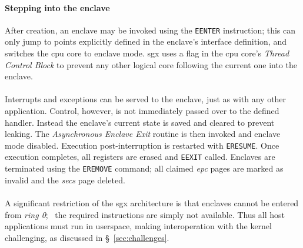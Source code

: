 \paragraph{Stepping into the enclave} After creation, an enclave may be invoked using the \texttt{EENTER} instruction; this can only jump to points explicitly defined in the enclave's interface definition, and switches the \acrshort{cpu} core to enclave mode. \acrshort{sgx} uses a flag in the \acrshort{cpu} core's \textit{Thread Control Block} to prevent any other logical core following the current one into the enclave.

\paragraph{} Interrupts and exceptions can be served to the enclave, just as with any other application. Control, however, is not immediately passed over to the defined handler. Instead the enclave's current state is saved and cleared to prevent leaking. The \textit{Asynchronous Enclave Exit} routine is then invoked and enclave mode disabled. Execution post-interruption is restarted with \texttt{ERESUME}. Once execution completes, all registers are erased and \texttt{EEXIT} called. Enclaves are terminated using the \texttt{EREMOVE} command; all claimed \textit{\acrshort{epc}} pages are marked as invalid and the \textit{\acrshort{secs}} page deleted.

\paragraph{} \label{sec:sgx-no-kernel-mode} A significant restriction of the \acrshort{sgx} architecture is that enclaves cannot be entered from \textit{ring 0};~\cite{sgx-prog-reference} the required instructions are simply not available. Thus all host applications must run in userspace, making interoperation with the kernel challenging, as discussed in §~\ref{sec:challenges}.

